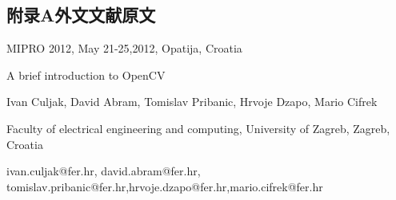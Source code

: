 \documentclass{bjtu-bachelor-thesis}
\begin{document}
\begin{appendices}
\section*{附录A\hspace{1em}外文文献原文}
\noindent MIPRO 2012, May 21-25,2012, Opatija, Croatia \par

\begin{center}
    A brief introduction to OpenCV\par
    Ivan Culjak, David Abram, Tomislav Pribanic, Hrvoje Dzapo, Mario Cifrek\par
    Faculty of electrical engineering and computing, University of Zagreb, Zagreb, Croatia\par
    ivan.culjak@fer.hr, david.abram@fer.hr, tomislav.pribanic@fer.hr,hrvoje.dzapo@fer.hr,mario.cifrek@fer.hr
\end{center}


\end{appendices}
\end{document}
